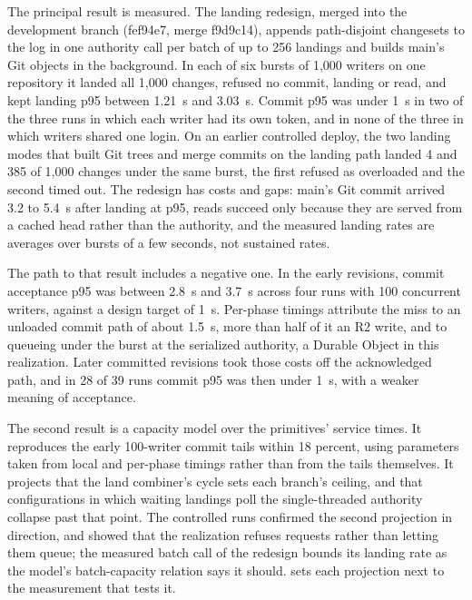 \documentclass[11pt,letterpaper]{article}
\theoremstyle{definition}
\theoremstyle{remark}
\begin{document}
The principal result is measured. The landing redesign, merged into the development branch (fef94e7, merge f9d9c14), appends path-disjoint changesets to the log in one authority call per batch of up to 256 landings and builds main's Git objects in the background. In each of six bursts of 1,000 writers on one repository it landed all 1,000 changes, refused no commit, landing or read, and kept landing p95 between 1.21~s and 3.03~s. %
Commit p95 was under 1~s in two of the three runs in which each writer had its own token, and in none of the three in which writers shared one login. %
On an earlier controlled deploy, the two landing modes that built Git trees and merge commits on the landing path landed 4 and 385 of 1,000 changes under the same burst, the first refused as overloaded and the second timed out. %
The redesign has costs and gaps: main's Git commit arrived 3.2 to 5.4~s after landing at p95, reads succeed only because they are served from a cached head rather than the authority, and the measured landing rates are averages over bursts of a few seconds, not sustained rates. %

The path to that result includes a negative one. In the early revisions, commit acceptance p95 was between 2.8~s and 3.7~s across four runs with 100 concurrent writers, against a design target of 1~s. %
Per-phase timings attribute the miss to an unloaded commit path of about 1.5~s, more than half of it an R2 write, and to queueing under the burst at the serialized authority, a Durable Object in this realization. %
Later committed revisions took those costs off the acknowledged path, and in 28 of 39 runs commit p95 was then under 1~s, with a weaker meaning of acceptance. %

The second result is a capacity model over the primitives' service times. It reproduces the early 100-writer commit tails within 18 percent, using parameters taken from local and per-phase timings rather than from the tails themselves. It projects that the land combiner's cycle sets each branch's ceiling, and that configurations in which waiting landings poll the single-threaded authority collapse past that point. The controlled runs confirmed the second projection in direction, and showed that the realization refuses requests rather than letting them queue; the measured batch call of the redesign bounds its landing rate as the model's batch-capacity relation says it should.  sets each projection next to the measurement that tests it.
\end{document}
